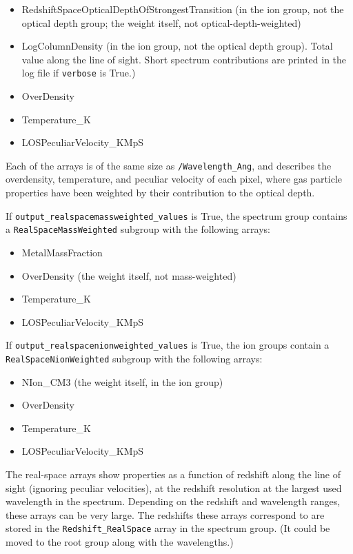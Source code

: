 \documentclass{report}
\newcommand{\param}[1]{{\tt #1}}
\begin{document}
\begin{itemize}
\item RedshiftSpaceOpticalDepthOfStrongestTransition (in the ion group, not the optical depth group; the weight itself, not optical-depth-weighted)
\item LogColumnDensity (in the ion group, not the optical depth group). Total value along the line of sight. Short spectrum contributions are printed in the log file if \param{verbose} is True.)
\item OverDensity
\item Temperature\_K
\item LOSPeculiarVelocity\_KMpS
\end{itemize}

Each of the arrays is of the same size as {\tt /Wavelength\_Ang}, and describes the overdensity, temperature, and peculiar velocity of each pixel, where gas particle properties have been weighted by their contribution to the optical depth.

If \param{output\_realspacemassweighted\_values} is True, the spectrum group contains a \param{RealSpaceMassWeighted} subgroup with the following arrays:
\begin{itemize}
\item MetalMassFraction 
\item OverDensity (the weight itself, not mass-weighted)
\item Temperature\_K
\item LOSPeculiarVelocity\_KMpS
\end{itemize}

If \param{output\_realspacenionweighted\_values} is True, the ion groups contain a \param{RealSpaceNionWeighted} subgroup with the following arrays:
\begin{itemize}
\item NIon\_CM3  (the weight itself, in the ion group)
\item OverDensity 
\item Temperature\_K
\item LOSPeculiarVelocity\_KMpS
\end{itemize}

The real-space arrays show properties as a function of redshift along the line of sight (ignoring peculiar velocities), at the redshift resolution at the largest used wavelength in the spectrum. Depending on the redshift and wavelength ranges, these arrays can be very large. The redshifts these arrays correspond to are stored in the \param{Redshift\_RealSpace} array in the spectrum group. (It could be moved to the root group along with the wavelengths.)
\end{document}
